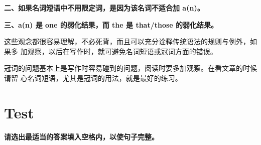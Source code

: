 \textbf{二、如果名词短语中不用限定词，是因为该名词不适合加 a(n)。}

\textbf{三、a(n) 是 one 的弱化结果，而 the 是 that/those 的弱化结果。}

这些观念都很容易理解，不必死背，而且可以充分诠释传统语法的规则与例外，如果多
加观察，以后在写作时，就可避免名词短语或冠词方面的错误。

冠词的问题基本上是写作时容易碰到的问题，阅读时要多加观察。在看文章的时候请留
心名词短语，尤其是冠词的用法，就是最好的练习。

\section{Test}


\textbf{请选出最适当的答案填入空格内，以使句子完整。}

